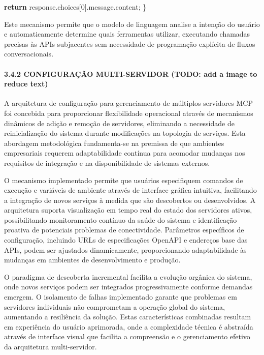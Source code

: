 \documentclass[
]{article}
\newenvironment{Shaded}{}{}
\newcommand{\AttributeTok}[1]{\textcolor[rgb]{0.49,0.56,0.16}{#1}}
\newcommand{\ControlFlowTok}[1]{\textcolor[rgb]{0.00,0.44,0.13}{\textbf{#1}}}
\newcommand{\DecValTok}[1]{\textcolor[rgb]{0.25,0.63,0.44}{#1}}
\newcommand{\NormalTok}[1]{#1}
\newcommand{\OperatorTok}[1]{\textcolor[rgb]{0.40,0.40,0.40}{#1}}
\begin{document}
\begin{Shaded}
\begin{Highlighting}[]
  \ControlFlowTok{return}\NormalTok{ response}\OperatorTok{.}\AttributeTok{choices}\NormalTok{[}\DecValTok{0}\NormalTok{]}\OperatorTok{.}\AttributeTok{message}\OperatorTok{.}\AttributeTok{content}\OperatorTok{;}
\NormalTok{\}}
\end{Highlighting}
\end{Shaded}

Este mecanismo permite que o modelo de linguagem analise a intenção do
usuário e automaticamente determine quais ferramentas utilizar,
executando chamadas precisas às APIs subjacentes sem necessidade de
programação explícita de fluxos conversacionais.

\paragraph{3.4.2 CONFIGURAÇÃO MULTI-SERVIDOR (TODO: add a image to
reduce
text)}\label{configurauxe7uxe3o-multi-servidor-todo-add-a-image-to-reduce-text}

A arquitetura de configuração para gerenciamento de múltiplos servidores
MCP foi concebida para proporcionar flexibilidade operacional através de
mecanismos dinâmicos de adição e remoção de servidores, eliminando a
necessidade de reinicialização do sistema durante modificações na
topologia de serviços. Esta abordagem metodológica fundamenta-se na
premissa de que ambientes empresariais requerem adaptabilidade contínua
para acomodar mudanças nos requisitos de integração e na disponibilidade
de sistemas externos.

O mecanismo implementado permite que usuários especifiquem comandos de
execução e variáveis de ambiente através de interface gráfica intuitiva,
facilitando a integração de novos serviços à medida que são descobertos
ou desenvolvidos. A arquitetura suporta visualização em tempo real do
estado dos servidores ativos, possibilitando monitoramento contínuo da
saúde do sistema e identificação proativa de potenciais problemas de
conectividade. Parâmetros específicos de configuração, incluindo URLs de
especificações OpenAPI e endereços base das APIs, podem ser ajustados
dinamicamente, proporcionando adaptabilidade às mudanças em ambientes de
desenvolvimento e produção.

O paradigma de descoberta incremental facilita a evolução orgânica do
sistema, onde novos serviços podem ser integrados progressivamente
conforme demandas emergem. O isolamento de falhas implementado garante
que problemas em servidores individuais não comprometam a operação
global do sistema, aumentando a resiliência da solução. Estas
características combinadas resultam em experiência do usuário
aprimorada, onde a complexidade técnica é abstraída através de interface
visual que facilita a compreensão e o gerenciamento efetivo da
arquitetura multi-servidor.
\end{document}
